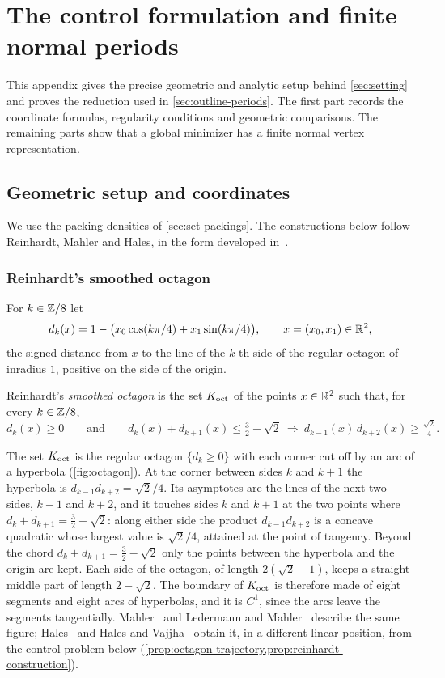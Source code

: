 \section{The control formulation and finite normal periods}\label{sec:reduction}

This appendix gives the precise geometric and analytic setup behind \cref{sec:setting} and
proves the reduction used in \cref{sec:outline-periods}. The first part records the coordinate
formulas, regularity conditions and geometric comparisons. The remaining parts show that a
global minimizer has a finite normal vertex representation.

\subsection{Geometric setup and coordinates}\label{app:setup}

We use the packing densities of \cref{sec:set-packings}. The constructions below follow
Reinhardt, Mahler and Hales, in the form developed in~\cite{HalesVajjha2024}.

\subsubsection{Reinhardt's smoothed octagon}\label{sec:set-octagon}

For $k\in\mathbb{Z}/8$ let
\[
  d_k(x)=1-\bigl(x_0\cos(k\pi/4)+x_1\sin(k\pi/4)\bigr),\qquad x=(x_0,x_1)\in\mathbb{R}^2,
\]
the signed distance from $x$ to the line of the $k$-th side of the regular octagon of inradius
$1$, positive on the side of the origin.

\begin{definition}\label{def:smoothed-octagon}
Reinhardt's \emph{smoothed octagon} is the set $K_{\mathrm{oct}}$ of the points $x\in\mathbb{R}^2$ such that, for every
$k\in\mathbb{Z}/8$,
\[
  d_k(x)\ge0\qquad\text{and}\qquad
  d_k(x)+d_{k+1}(x)\le\tfrac32-\sqrt2\ \Longrightarrow\ d_{k-1}(x)\,d_{k+2}(x)\ge\tfrac{\sqrt2}{4}.
\]
\end{definition}

The set $K_{\mathrm{oct}}$ is the regular octagon $\{d_k\ge0\}$ with each corner cut off by an arc of a
hyperbola (\cref{fig:octagon}). At the corner between sides $k$ and $k+1$ the hyperbola is
$d_{k-1}d_{k+2}=\sqrt2/4$. Its asymptotes are the lines of the next two sides, $k-1$ and $k+2$, and
it touches sides $k$ and $k+1$ at the two points where $d_k+d_{k+1}=\tfrac32-\sqrt2$: along either
side the product $d_{k-1}d_{k+2}$ is a concave quadratic whose largest value is $\sqrt2/4$, attained
at the point of tangency. Beyond the chord $d_k+d_{k+1}=\tfrac32-\sqrt2$ only the points between the
hyperbola and the origin are kept. Each side of the octagon, of length $2(\sqrt2-1)$, keeps a
straight middle part of length $2-\sqrt2$. The boundary of $K_{\mathrm{oct}}$ is therefore made of eight
segments and eight arcs of hyperbolas, and it is $C^1$, since the arcs leave the segments
tangentially. Mahler~\cite{Mahler1947c} and Ledermann and Mahler~\cite{LedermannMahler1949}
describe the same figure; Hales~\cite{Hales2011} and Hales and Vajjha~\cite[\S7.5]{HalesVajjha2024}
obtain it, in a different linear position, from the control problem below
(\cref{prop:octagon-trajectory,prop:reinhardt-construction}).

